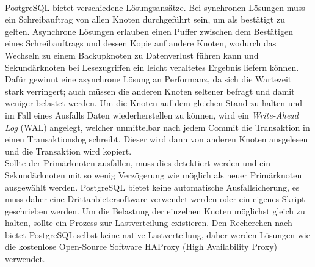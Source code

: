 \paragraph{}
PostgreSQL bietet verschiedene Lösungsansätze. Bei synchronen Lösungen muss ein Schreibauftrag von allen Knoten durchgeführt sein, um als bestätigt zu gelten. Asynchrone Lösungen erlauben einen Puffer zwischen dem Bestätigen eines Schreibauftrags und dessen Kopie auf andere Knoten, wodurch das Wechseln zu einem Backupknoten zu Datenverlust führen kann und Sekundärknoten bei Lesezugriffen ein leicht veraltetes Ergebnis liefern können. Dafür gewinnt eine asynchrone Lösung an Performanz, da sich die Wartezeit stark verringert; auch müssen die anderen Knoten seltener befragt und damit weniger belastet werden. Um die Knoten auf dem gleichen Stand zu halten und im Fall eines Ausfalls Daten wiederherstellen zu können, wird ein \textit{Write-Ahead Log} (WAL) angelegt, welcher unmittelbar nach jedem Commit die Transaktion in einen Transaktionslog schreibt. Dieser wird dann von anderen Knoten ausgelesen und die Transaktion wird kopiert. \cite{PG1}\\
Sollte der Primärknoten ausfallen, muss dies detektiert werden und ein Sekundärknoten mit so wenig Verzögerung wie möglich als neuer Primärknoten ausgewählt werden. PostgreSQL bietet keine automatische Ausfallsicherung, es muss daher eine Drittanbietersoftware verwendet werden oder ein eigenes Skript geschrieben werden. Um die Belastung der einzelnen Knoten möglichst gleich zu halten, sollte ein Prozess zur Lastverteilung existieren. Den Recherchen nach bietet PostgreSQL selbst keine native Lastverteilung, daher werden Lösungen wie die kostenlose Open-Source Software HAProxy (High Availability Proxy) verwendet.

